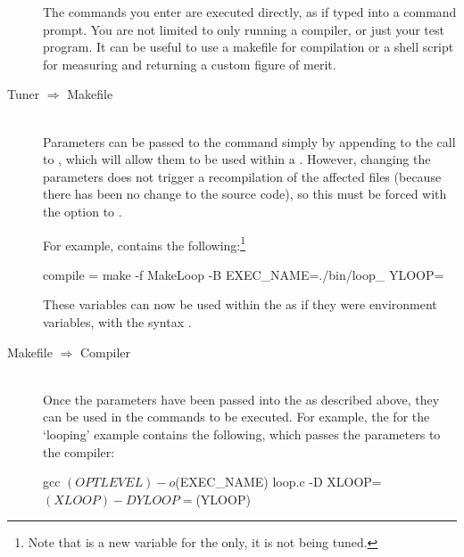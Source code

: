 \documentclass[a4paper, draft]{article}
\begin{document}
\begin{description}
    The commands you enter are executed directly, as if typed into a command 
    prompt. You are not limited to only running a compiler, or just your test 
    program. It can be useful to use a makefile for compilation or a shell 
    script for measuring and returning a custom figure of merit.



\item[Tuner $\Longrightarrow$ Makefile] \hfill\\
    Parameters can be passed to the  command simply by appending 
     to the call to , which will allow 
    them to be used within a . However, changing the 
    parameters does not trigger a recompilation of the affected files 
    (because there has been no change to the source code), so this must be 
    forced with the  option to .
    
    For example,  contains the following:\footnote{Note 
    that  is a new variable for the  only, 
    it is not being tuned.}
    \begin{Code}[firstnumber=50, stepnumber=2, firstline=2,
                    label=\codelabel{examples/looping/looping.conf}]
    
compile = make -f MakeLoop -B EXEC_NAME=./bin/loop_%
                            YLOOP=%
    \end{Code}
    
    These variables can now be used within the  as if they 
    were environment variables, with the syntax .





\item[Makefile $\Longrightarrow$ Compiler] \hfill\\
    Once the parameters have been passed into the  as described 
    above, they can be used in the commands to be executed. For example, the 
     for the `looping' example contains the following, 
    which passes the parameters to the compiler:
    \begin{Code}[firstnumber=4, label=\codelabel{examples/looping/MakeLoop}]
gcc $(OPTLEVEL) -o $(EXEC_NAME) loop.c -D XLOOP=$(XLOOP) -D YLOOP=$(YLOOP)
    \end{Code}







\end{description}
\end{document}

